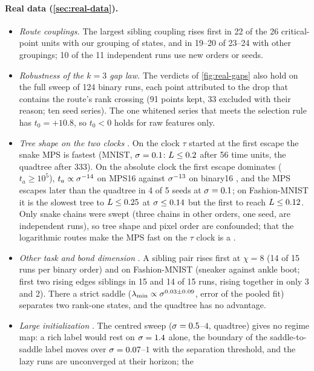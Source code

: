 \paragraph{Real data (\cref{sec:real-data}).}
\begin{itemize}
  \item \emph{Route couplings.} The largest sibling coupling rises first in 22 of the 26 critical-point
    units with our grouping of states, and in 19--20 of 23--24 with other groupings; 10 of the 11 independent
    runs use new orders or seeds.
  \item \emph{Robustness of the $k=3$ gap law.} The verdicts of \cref{fig:real-gaps} also hold on the full sweep of
    124 binary runs, each point attributed to the drop that contains the route's rank crossing (91 points
    kept, 33 excluded with their reason; ten seed series). The one whitened series that meets the selection rule has $t_0=+10.8$, so $t_0<0$ holds for
    raw features only.
  \item \emph{Tree shape on the two clocks} \empirical. On the clock $\tau$ started at the first escape the
    snake MPS is fastest (MNIST, $\sigma=0.1$: $L\le0.2$ after 56 time units, the quadtree after 333). On the
    absolute clock the first escape dominates ($t_a\ge10^5$), $t_a\propto\sigma^{-14}$ on MPS16 against $\sigma^{-13}$ on
    binary16 \proven, and the MPS escapes later than the quadtree in 4 of 5 seeds at $\sigma=0.1$; on
    Fashion-MNIST it is the slowest tree to $L\le0.25$ at $\sigma\le0.14$ but the first to reach $L\le0.12$.
    Only snake chains were swept (three chains in other orders, one seed, are independent runs), so tree
    shape and pixel order are confounded; that the logarithmic routes
    make the MPS fast on the $\tau$ clock is a \conjecture.
  \item \emph{Other task and bond dimension} \empirical. A sibling pair rises first at $\chi=8$ (14 of 15 runs
    per binary order) and on Fashion-MNIST (sneaker against ankle boot; first two rising edges siblings in
    15 and 14 of 15 runs, rising together in only 3 and 2). There a strict saddle
    ($\lambda_{\min}\propto\sigma^{0.03\pm0.09}$, error of the pooled fit) separates two rank-one states, and the
    quadtree has no advantage.
  \item \emph{Large initialization} \empirical. The centred sweep ($\sigma=0.5$--$4$, quadtree) gives no regime
    map: a rich label would rest on $\sigma=1.4$ alone, the boundary of the saddle-to-saddle label moves over
    $\sigma=0.07$--$1$ with the separation threshold, and the lazy runs are unconverged at their horizon; the

\end{itemize}
